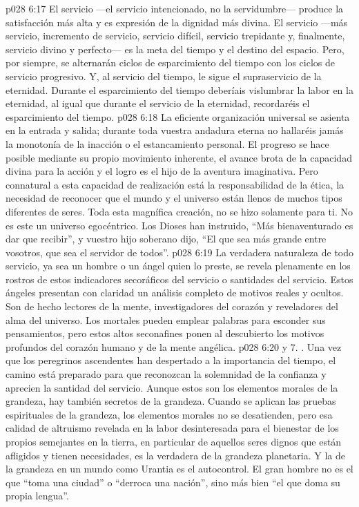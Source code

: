 \vs p028 6:17 El servicio ---el servicio intencionado, no la servidumbre--- produce la satisfacción más alta y es expresión de la dignidad más divina. El servicio ---más servicio, incremento de servicio, servicio difícil, servicio trepidante y, finalmente, servicio divino y perfecto--- es la meta del tiempo y el destino del espacio. Pero, por siempre, se alternarán ciclos de esparcimiento del tiempo con los ciclos de servicio progresivo. Y, al servicio del tiempo, le sigue el supraservicio de la eternidad. Durante el esparcimiento del tiempo deberíais vislumbrar la labor en la eternidad, al igual que durante el servicio de la eternidad, recordaréis el esparcimiento del tiempo.
\vs p028 6:18 \pc La eficiente organización universal se asienta en la entrada y salida; durante toda vuestra andadura eterna no hallaréis jamás la monotonía de la inacción o el estancamiento personal. El progreso se hace posible mediante su propio movimiento inherente, el avance brota de la capacidad divina para la acción y el logro es el hijo de la aventura imaginativa. Pero connatural a esta capacidad de realización está la responsabilidad de la ética, la necesidad de reconocer que el mundo y el universo están llenos de muchos tipos diferentes de seres. Toda esta magnífica creación,  no se hizo solamente para ti. No es este un universo egocéntrico. Los Dioses han instruido, “Más bienaventurado es dar que recibir”, y vuestro hijo soberano dijo, “El que sea más grande entre vosotros, que sea el servidor de todos”.
\vs p028 6:19 \pc La verdadera naturaleza de todo servicio, ya sea un hombre o un ángel quien lo preste, se revela plenamente en los rostros de estos indicadores secoráficos del servicio o santidades del servicio. Estos ángeles presentan con claridad un análisis completo de motivos reales y ocultos. Son de hecho lectores de la mente, investigadores del corazón y reveladores del alma del universo. Los mortales pueden emplear palabras para esconder sus pensamientos, pero estos altos seconafines ponen al descubierto los motivos profundos del corazón humano y de la mente angélica.
\vs p028 6:20  y 7. . Una vez que los peregrinos ascendentes han despertado a la importancia del tiempo, el camino está preparado para que reconozcan la solemnidad de la confianza y aprecien la santidad del servicio. Aunque estos son los elementos morales de la grandeza, hay también secretos de la grandeza. Cuando se aplican las pruebas espirituales de la grandeza, los elementos morales no se desatienden, pero esa calidad de altruismo revelada en la labor desinteresada para el bienestar de los propios semejantes en la tierra, en particular de aquellos seres dignos que están afligidos y tienen necesidades, es la verdadera  de la grandeza planetaria. Y la  de la grandeza en un mundo como Urantia es el autocontrol. El gran hombre no es el que “toma una ciudad” o “derroca una nación”, sino más bien “el que doma su propia lengua”.
